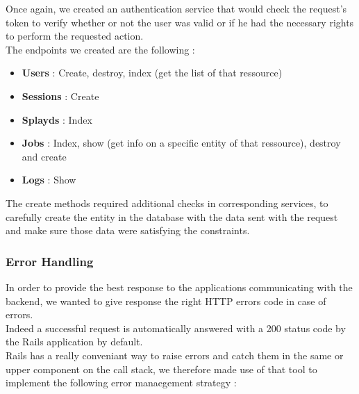 \documentclass{eplmastersthesis}
\begin{document}
          Once again, we created an authentication service that would check
          the request's token to verify whether or not the user was valid or
          if he had the necessary rights to perform the requested action.\\

          The endpoints we created are the following :

          \begin{itemize}
            \item \textbf{Users} : Create, destroy, index (get the list of that
            ressource)
            \item \textbf{Sessions} : Create
            \item \textbf{Splayds} : Index
            \item \textbf{Jobs} : Index, show (get info on a specific entity
            of that ressource), destroy and create
            \item \textbf{Logs} : Show
          \end{itemize}

          The create methods required additional checks in corresponding
          services, to carefully create the entity in the database with
          the data sent with the request and make sure those data were
          satisfying the constraints.\\

        \subsubsection{Error Handling}

          In order to provide the best response to the applications
          communicating with the backend, we wanted to give response
          the right HTTP errors code in case of errors.\\

          Indeed a successful request is automatically answered with a 200
          status code by the Rails application by default.\\
          Rails has a really conveniant way to raise errors and catch them
          in the same or upper component on the call stack, we therefore
          made use of that tool to implement the following error manaegement
          strategy :
\end{document}
